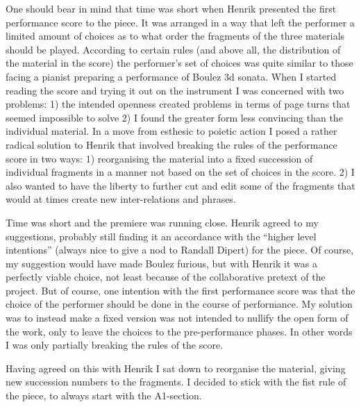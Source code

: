 One should bear in mind that time was short when Henrik presented the
first performance score to the piece. It was arranged in a way that
left the performer a limited amount of choices as to what order the
fragments of the three materials should be played. According to
certain rules (and above all, the distribution of the material in the
score) the performer's set of choices was quite similar to those
facing a pianist preparing a performance of Boulez 3d sonata. When I
started reading the score and trying it out on the instrument I was
concerned with two problems: 1) the intended openness created problems
in terms of page turns that seemed impossible to solve 2) I found the
greater form less convincing than the individual material. In a move
from esthesic to poietic action I posed a rather radical solution to
Henrik that involved breaking the rules of the performance score in
two ways: 1) reorganising the material into a fixed succession of
individual fragments in a manner not based on the set of choices in
the score. 2) I also wanted to have the liberty to further cut and
edit some of the fragments that would at times create new
inter-relations and phrases.

Time was short and the premiere was running close. Henrik agreed to my
suggestions, probably still finding it an accordance with the ``higher
level intentions'' (always nice to give a nod to Randall Dipert) for
the piece. Of course, my suggestion would have made Boulez furious,
but with Henrik it was a perfectly viable choice, not least because of
the collaborative pretext of the project. But of course, one intention
with the first performance score was that the choice of the performer
should be done in the course of performance. My solution was to
instead make a fixed version was not intended to nullify the open form
of the work, only to leave the choices to the pre-performance
phases. In other words I was only partially breaking the rules of the
score.

Having agreed on this with Henrik I sat down to reorganise the
material, giving new succession numbers to the fragments. I decided to
stick with the fist rule of the piece, to always start with the
A1-section.

